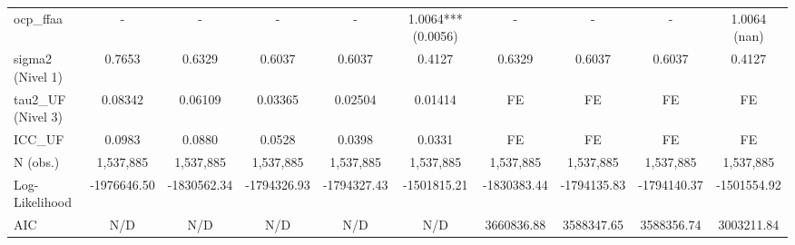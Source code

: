 \begin{table}
\begin{tabular}{lccccccccc}
ocp_ffaa & - & - & - & - & 1.0064*** (0.0056) & - & - & - & 1.0064 (nan) \\
sigma2 (Nivel 1) & 0.7653 & 0.6329 & 0.6037 & 0.6037 & 0.4127 & 0.6329 & 0.6037 & 0.6037 & 0.4127 \\
tau2_UF (Nivel 3) & 0.08342 & 0.06109 & 0.03365 & 0.02504 & 0.01414 & FE & FE & FE & FE \\
ICC_UF & 0.0983 & 0.0880 & 0.0528 & 0.0398 & 0.0331 & FE & FE & FE & FE \\
N (obs.) & 1,537,885 & 1,537,885 & 1,537,885 & 1,537,885 & 1,537,885 & 1,537,885 & 1,537,885 & 1,537,885 & 1,537,885 \\
Log-Likelihood & -1976646.50 & -1830562.34 & -1794326.93 & -1794327.43 & -1501815.21 & -1830383.44 & -1794135.83 & -1794140.37 & -1501554.92 \\
AIC & N/D & N/D & N/D & N/D & N/D & 3660836.88 & 3588347.65 & 3588356.74 & 3003211.84 \\
\bottomrule
\end{tabular}
\end{table}
